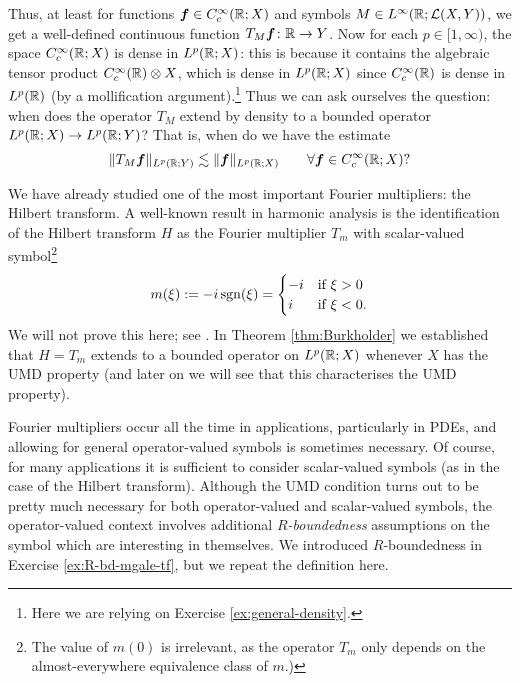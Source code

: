 Thus, at least for functions $\bm{f} \in C_{c}^\infty(\mathbb{R};X)$ and symbols $M \in L^\infty(\mathbb{R};\mathcal{L}(X,Y))$, we get a well-defined continuous function $T_{M}\bm{f} \colon \mathbb{R} \to Y$.
Now for each $p \in [1,\infty)$, the space $C_{c}^\infty(\mathbb{R};X)$ is dense in $L^p(\mathbb{R};X)$: this is because it contains the algebraic tensor product $C_{c}^\infty(\mathbb{R}) \otimes X$, which is dense in $L^p(\mathbb{R};X)$ since $C_{c}^\infty(\mathbb{R})$ is dense in $L^p(\mathbb{R})$ (by a mollification argument).\footnote{Here we are relying on Exercise \ref{ex:general-density}.}
Thus we can ask ourselves the question: when does the operator $T_{M}$ extend by density to a bounded operator $L^p(\mathbb{R};X) \to L^p(\mathbb{R};Y)$?
That is, when do we have the estimate
\begin{equation*}
  \|T_{M} \bm{f}\|_{L^p(\mathbb{R};Y)} \lesssim \|\bm{f}\|_{L^p(\mathbb{R};X)} \qquad \forall \bm{f} \in C_{c}^\infty(\mathbb{R};X)?
\end{equation*}

We have already studied one of the most important Fourier multipliers: the Hilbert transform.
A well-known result in harmonic analysis is the identification of the Hilbert transform $H$ as the Fourier multiplier $T_{m}$ with scalar-valued symbol\footnote{The value of $m(0)$ is irrelevant, as the operator $T_{m}$ only depends on the almost-everywhere equivalence class of $m$.)}
\begin{equation*}
  m(\xi) := -i\operatorname{sgn}(\xi) =
  \begin{cases}
    -i &\text{if $\xi > 0$} \\
    i &\text{if $\xi < 0$.}
  \end{cases}
\end{equation*}
We will not prove this here; see \cite[Proposition 5.2.2]{HNVW16}.
In Theorem \ref{thm:Burkholder} we established that $H = T_{m}$ extends to a bounded operator on $L^p(\mathbb{R};X)$ whenever $X$ has the UMD property (and later on we will see that this characterises the UMD property).

Fourier multipliers occur all the time in applications, particularly in PDEs, and allowing for general operator-valued symbols is sometimes necessary.
Of course, for many applications it is sufficient to consider scalar-valued symbols (as in the case of the Hilbert transform).
Although the UMD condition turns out to be pretty much necessary for both operator-valued and scalar-valued symbols, the operator-valued context involves additional \emph{$R$-boundedness} assumptions on the symbol which are interesting in themselves.
We introduced $R$-boundedness in Exercise \ref{ex:R-bd-mgale-tf}, but we repeat the definition here. 

